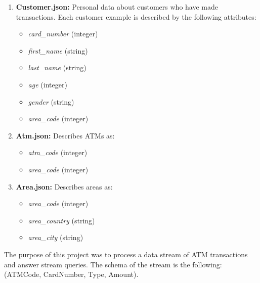 \documentclass[12pt]{report}
\begin{document}
{\begin{enumerate}
\item \textbf{Customer.json:} Personal data about customers who have made transactions. Each customer example is described by the following attributes: 
	\begin{itemize}
	\item \textit{card\_number} (integer) 
	\item \textit{first\_name} (string)
	\item \textit{last\_name} (string)
	\item \textit{age} (integer)
	\item \textit{gender} (string)
	\item \textit{area\_code} (integer)
	\end{itemize}
\item \textbf{Atm.json:} Describes ATMs as:
	\begin{itemize}
	\item \textit{atm\_code} (integer)
	\item \textit{area\_code} (integer)
	\end{itemize}
\item \textbf{Area.json:} Describes areas as:
	\begin{itemize}
	\item \textit{area\_code} (integer)
	\item \textit{area\_country} (string)
	\item \textit{area\_city} (string)
	\end{itemize}
\end{enumerate}

\noindent The purpose of this project was to process a data stream of ATM transactions and answer stream queries. The schema of the stream is the following: (ATMCode, CardNumber, Type, Amount).

\newpage

}
\end{document}
